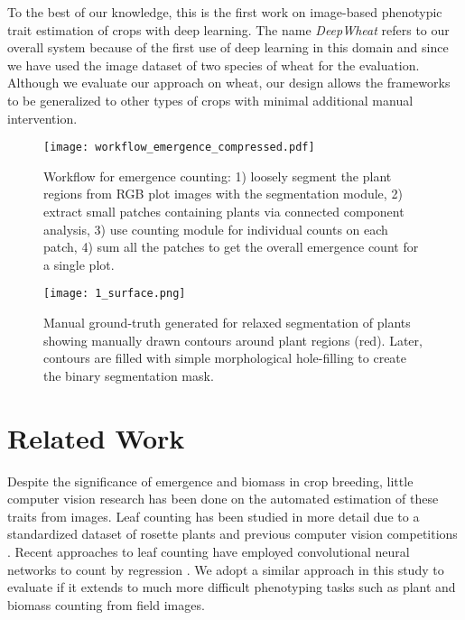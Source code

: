 \documentclass[10pt,twocolumn,letterpaper]{article}
\begin{document}
To the best of our knowledge, this is the first work on image-based phenotypic trait estimation of crops with deep learning. The name \textit{DeepWheat} refers to our overall system because of the first use of deep learning in this domain and since we have used the image dataset of two species of wheat for the evaluation. Although we evaluate our approach on wheat, our design allows the frameworks to be generalized to other types of crops with minimal additional manual intervention.


\begin{figure*}[t!]
	\centering
	\texttt{[image: workflow\_emergence\_compressed.pdf]}
    \caption{Workflow for emergence counting: 1) loosely segment the plant regions from RGB plot images with the segmentation module, 2) extract small patches containing plants via connected component analysis, 3) use counting module for individual counts on each patch, 4) sum all the patches to get the overall emergence count for a single plot.}
    \label{fig:workflow_emergence}
\end{figure*}

\begin{figure*}[]
	\centering
	\texttt{[image: 1\_surface.png]}
    \caption{Manual ground-truth generated for relaxed segmentation of plants showing manually drawn contours around plant regions (red). Later, contours are filled with simple morphological hole-filling to create the binary segmentation mask.}
    \label{fig:gt}
\end{figure*}


\section{Related Work}
\label{sec:rw}

Despite the significance of emergence and biomass in crop breeding, little computer vision research has been done on the automated estimation of these traits from images. Leaf counting has been studied in more detail due to a standardized dataset of rosette plants and previous computer vision competitions \cite{lcc-2017}. Recent approaches to leaf counting have employed convolutional neural networks to count by regression \cite{aich-cvppp2017}. We adopt a similar approach in this study to evaluate if it extends to much more difficult phenotyping tasks such as plant and biomass counting from field images.
\end{document}

